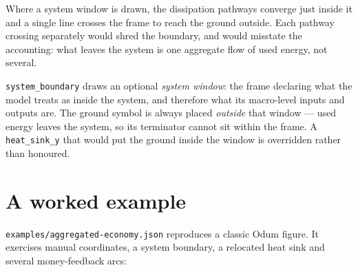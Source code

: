 \documentclass{article}
\begin{document}
Where a system window is drawn, the dissipation pathways converge just inside it
and a single line crosses the frame to reach the ground outside. Each pathway
crossing separately would shred the boundary, and would misstate the accounting:
what leaves the system is one aggregate flow of used energy, not several.

\texttt{system\_boundary} draws an optional \emph{system window}: the frame
declaring what the model treats as inside the system, and therefore what its
macro-level inputs and outputs are. The ground symbol is always placed
\emph{outside} that window --- used energy leaves the system, so its terminator
cannot sit within the frame. A \texttt{heat\_sink\_y} that would put the ground
inside the window is overridden rather than honoured.

\section{A worked example}

\texttt{examples/aggregated-economy.json} reproduces a classic Odum figure. It
exercises manual coordinates, a system boundary, a relocated heat sink and
several money-feedback arcs:

\begin{center}
\end{center}
\end{document}

